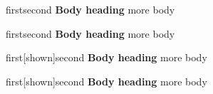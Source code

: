 
\begin{mixed}{first}{second}
  {\bfseries Body heading} more body
\end{mixed}

\begin{mixed}[shown]{first}{second}
  {\bfseries Body heading} more body
\end{mixed}

\begin{mixed}{first}[shown]{second}
  {\bfseries Body heading} more body
\end{mixed}

\begin{mixed}[shown]{first}[shown]{second}
  {\bfseries Body heading} more body
\end{mixed}
